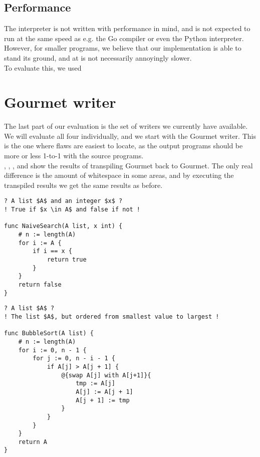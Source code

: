 \subsection{Performance}


The interpreter is not written with performance in mind, and is not expected to run at the same speed as e.g. the Go compiler or even the Python interpreter. However, for smaller programs, we believe that our implementation is able to stand its ground, and at is not necessarily annoyingly slower. \\

To evaluate this, we used 

\section{Gourmet writer}

The last part of our evaluation is the set of writers we currently have available. We will evaluate all four individually, and we start with the Gourmet writer. This is the one where flaws are easiest to locate, as the output programs should be more or less 1-to-1 with the source programs. \\

, , , and  show the results of transpiling Gourmet back to Gourmet. The only real difference is the amount of whitespace in some areas, and by executing the transpiled results we get the same results as before. \\

\begin{lstlisting}[caption={The result of transpiling \Cref{naiveSearchGourmet} back to Gourmet.}, captionpos=b, label={naiveSearchGourmet2}]
? A list $A$ and an integer $x$ ?
! True if $x \in A$ and false if not !

func NaiveSearch(A list, x int) {
	# n := length(A)
	for i := A {
		if i == x {
			return true
		}
	}
	return false
}
\end{lstlisting}

\begin{lstlisting}[caption={The result of transpiling \Cref{bubbleSortGourmet} back to Gourmet.}, captionpos=b, label={bubbleSortGourmet2}]
? A list $A$ ?
! The list $A$, but ordered from smallest value to largest !

func BubbleSort(A list) {
	# n := length(A)
	for i := 0, n - 1 {
		for j := 0, n - i - 1 {
			if A[j] > A[j + 1] {
				@{swap A[j] with A[j+1]}{
					tmp := A[j]
					A[j] := A[j + 1]
					A[j + 1] := tmp
				}
			}
		}
	}
	return A
}
\end{lstlisting}

